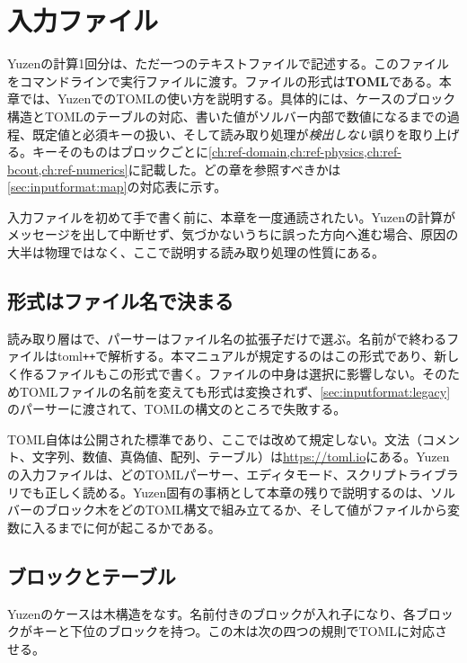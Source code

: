 \chapter{入力ファイル}
\label{ch:inputformat}

Yuzenの計算1回分は、ただ一つのテキストファイルで記述する。このファイルをコマンドラインで実行ファイルに渡す。ファイルの形式は\textbf{TOML}である。本章では、YuzenでのTOMLの使い方を説明する。具体的には、ケースのブロック構造とTOMLのテーブルの対応、書いた値がソルバー内部で数値になるまでの過程、既定値と必須キーの扱い、そして読み取り処理が\emph{検出しない}誤りを取り上げる。キーそのものはブロックごとに\cref{ch:ref-domain,ch:ref-physics,ch:ref-bcout,ch:ref-numerics}に記載した。どの章を参照すべきかは\cref{sec:inputformat:map}の対応表に示す。

入力ファイルを初めて手で書く前に、本章を一度通読されたい。Yuzenの計算がメッセージを出して中断せず、気づかないうちに誤った方向へ進む場合、原因の大半は物理ではなく、ここで説明する読み取り処理の性質にある。

\section{形式はファイル名で決まる}
\label{sec:inputformat:formats}

読み取り層はで、パーサーはファイル名の拡張子だけで選ぶ。名前がで終わるファイルはtoml\texttt{++}で解析する。本マニュアルが規定するのはこの形式であり、新しく作るファイルもこの形式で書く。ファイルの中身は選択に影響しない。そのためTOMLファイルの名前を変えても形式は変換されず、\cref{sec:inputformat:legacy}のパーサーに渡されて、TOMLの構文のところで失敗する。

TOML自体は公開された標準であり、ここでは改めて規定しない。文法（コメント、文字列、数値、真偽値、配列、テーブル）は\url{https://toml.io}にある。Yuzenの入力ファイルは、どのTOMLパーサー、エディタモード、スクリプトライブラリでも正しく読める。Yuzen固有の事柄として本章の残りで説明するのは、ソルバーのブロック木をどのTOML構文で組み立てるか、そして値がファイルから変数に入るまでに何が起こるかである。

\section{ブロックとテーブル}
\label{sec:inputformat:tables}

Yuzenのケースは木構造をなす。名前付きのブロックが入れ子になり、各ブロックがキーと下位のブロックを持つ。この木は次の四つの規則でTOMLに対応させる。

